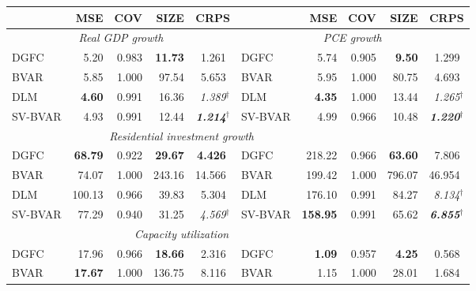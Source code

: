 \begin{tabular}{@{}lrrrr@{\qquad}lrrrr@{}}
\toprule
 & MSE & COV & SIZE & CRPS &  & MSE & COV & SIZE & CRPS \\
\midrule
\multicolumn{5}{c}{\textit{Real GDP growth}} & \multicolumn{5}{c}{\textit{PCE growth}} \\
\cmidrule(r){1-5}\cmidrule(l){6-10}
DGFC      & 5.20 & 0.983 & \textbf{11.73} & 1.261$^{\phantom{\dagger}}$ & DGFC      & 5.74 & 0.905 & \textbf{9.50} & 1.299$^{\phantom{\dagger}}$ \\
BVAR      & 5.85 & 1.000 & 97.54 & 5.653$^{\phantom{\dagger}}$ & BVAR      & 5.95 & 1.000 & 80.75 & 4.693$^{\phantom{\dagger}}$ \\
DLM       & \textbf{4.60} & 0.991 & 16.36 & \textit{1.389}$^{\dagger}$ & DLM       & \textbf{4.35} & 1.000 & 13.44 & \textit{1.265}$^{\dagger}$ \\
SV-BVAR   & 4.93 & 0.991 & 12.44 & \textit{\textbf{1.214}}$^{\dagger}$ & SV-BVAR   & 4.99 & 0.966 & 10.48 & \textit{\textbf{1.220}}$^{\dagger}$ \\
\addlinespace
\multicolumn{5}{c}{\textit{BFI growth}} & \multicolumn{5}{c}{\textit{Residential investment growth}} \\
\cmidrule(r){1-5}\cmidrule(l){6-10}
DGFC      & \textbf{68.79} & 0.922 & \textbf{29.67} & \textbf{4.426}$^{\phantom{\dagger}}$ & DGFC      & 218.22 & 0.966 & \textbf{63.60} & 7.806$^{\phantom{\dagger}}$ \\
BVAR      & 74.07 & 1.000 & 243.16 & 14.566$^{\phantom{\dagger}}$ & BVAR      & 199.42 & 1.000 & 796.07 & 46.954$^{\phantom{\dagger}}$ \\
DLM       & 100.13 & 0.966 & 39.83 & 5.304$^{\phantom{\dagger}}$ & DLM       & 176.10 & 0.991 & 84.27 & \textit{8.134}$^{\dagger}$ \\
SV-BVAR   & 77.29 & 0.940 & 31.25 & \textit{4.569}$^{\dagger}$ & SV-BVAR   & \textbf{158.95} & 0.991 & 65.62 & \textit{\textbf{6.855}}$^{\dagger}$ \\
\addlinespace
\multicolumn{5}{c}{\textit{Industrial production growth}} & \multicolumn{5}{c}{\textit{Capacity utilization}} \\
\cmidrule(r){1-5}\cmidrule(l){6-10}
DGFC      & 17.96 & 0.966 & \textbf{18.66} & 2.316$^{\phantom{\dagger}}$ & DGFC      & \textbf{1.09} & 0.957 & \textbf{4.25} & 0.568$^{\phantom{\dagger}}$ \\
BVAR      & \textbf{17.67} & 1.000 & 136.75 & 8.116$^{\phantom{\dagger}}$ & BVAR      & 1.15 & 1.000 & 28.01 & 1.684$^{\phantom{\dagger}}$ \\

\end{tabular}
